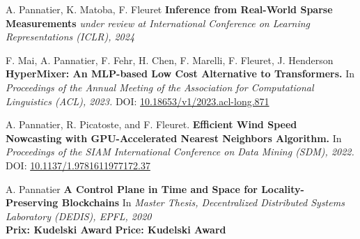 \small
A. Pannatier, K. Matoba, F. Fleuret \textbf{Inference from Real-World Sparse Measurements} \textit{under review at International Conference on Learning Representations (ICLR), 2024}
\commonvspace

F. Mai, A. Pannatier, F. Fehr, H. Chen, F. Marelli, F. Fleuret, J. Henderson \textbf{HyperMixer: An MLP-based Low Cost Alternative to Transformers.} In \textit{Proceedings of the Annual Meeting of the Association for Computational Linguistics (ACL), 2023.} DOI: \href{https://doi.org/10.18653/v1/2023.acl-long.871}{10.18653/v1/2023.acl-long.871}
\commonvspace

A. Pannatier, R. Picatoste, and F. Fleuret. \textbf{Efficient Wind Speed Nowcasting with GPU-Accelerated Nearest Neighbors Algorithm.} In \textit{Proceedings of the SIAM International Conference on Data Mining (SDM), 2022.} DOI: \href{https://doi.org/10.1137/1.9781611977172.37}{10.1137/1.9781611977172.37}
\commonvspace

A. Pannatier \textbf{A Control Plane in Time and Space for Locality-Preserving Blockchains} In \textit{Master Thesis, Decentralized Distributed Systems Laboratory (DEDIS), EPFL, 2020} \\
\ifFrench
  \textbf{Prix: Kudelski Award}
\else
  \textbf{Price: Kudelski Award}
\fi
\commonvspace